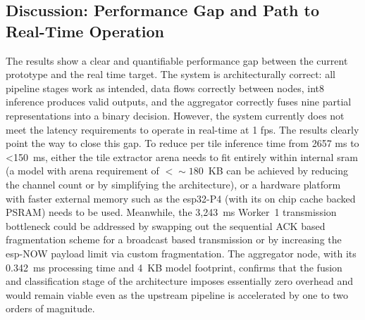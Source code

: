 \subsection{Discussion: Performance Gap and Path to Real-Time Operation}
 
The results show a clear and quantifiable performance gap between the current prototype and the real time target. The system is architecturally correct: all pipeline stages work as intended, data flows correctly between nodes, \gls{int8} inference produces valid outputs, and the aggregator correctly fuses nine partial representations into a binary decision. However, the system currently does not meet the latency requirements to operate in real-time at 1 \gls{fps}.
The results clearly point the way to close this gap. To reduce per tile inference time from 2657 ms to <150~ms, either the tile extractor arena needs to fit entirely within internal \gls{sram} (a model with arena requirement of $<\sim 180$~KB can be achieved by reducing the channel count or by simplifying the architecture), or a hardware platform with faster external memory such as the \gls{esp}32-P4 (with its on chip cache backed PSRAM) needs to be used. Meanwhile, the 3,243~ms Worker~1 transmission bottleneck could be addressed by swapping out the sequential ACK based fragmentation scheme for a broadcast based transmission or by increasing the \gls{esp}-NOW payload limit via custom fragmentation.
The aggregator node, with its 0.342~ms processing time and 4~KB model footprint, confirms that the fusion and classification stage of the architecture imposes essentially zero overhead and would remain viable even as the upstream pipeline is accelerated by one to two orders of magnitude.

 
